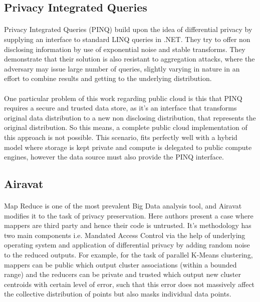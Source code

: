 \documentclass[12pt]{report}
\theoremstyle{named}
\begin{document}
\subsection{Privacy Integrated Queries}
\paragraph{}
Privacy Integrated Queries (PINQ) \cite{mcsherry2009privacy} build upon the idea of differential privacy by supplying an interface to standard LINQ queries in .NET. They try to offer non disclosing information by use of exponential noise and stable transforms. They demonstrate that their solution is also resistant to aggregation attacks, where the adversary may issue large number of queries, slightly varying in nature in an effort to combine results and getting to the underlying distribution.
\paragraph{}
One particular problem of this work regarding public cloud is this that PINQ requires a secure and trusted data store, as it’s an interface that transforms original data distribution to a new non disclosing distribution, that represents the original distribution. So this means, a complete public cloud implementation of this approach is not possible. This scenario, fits perfectly well with a hybrid model where storage is kept private and compute is delegated to public compute engines, however the data source must also provide the PINQ interface.
\subsection{Airavat}
\paragraph{}
Map Reduce is one of the most prevalent Big Data analysis tool, and Airavat \cite{roy2010airavat} modifies it to the task of privacy preservation. Here authors present a case where mappers are third party and hence their code is untrusted. It's methodology has two main components i.e. Mandated Access Control via the help of underlying operating system and application of differential privacy by adding random noise to the reduced outputs. For example, for the task of parallel K-Means clustering, mappers can be public which output cluster associations (within a bounded range) and the reducers can be private and trusted which output new cluster centroids with certain level of error, such that this error does not massively affect the collective distribution of points but also masks individual data points.
\end{document}
